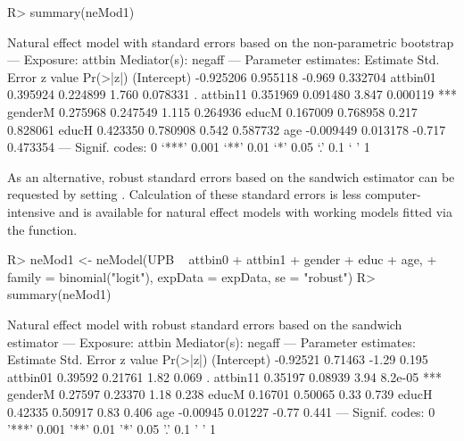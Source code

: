 \documentclass[nojss]{jss}
\begin{document}
\begin{Schunk}
\begin{Sinput}
R> summary(neMod1)
\end{Sinput}
\begin{Soutput}
Natural effect model
with standard errors based on the non-parametric bootstrap
---
Exposure: attbin 
Mediator(s): negaff 
---
Parameter estimates:
             Estimate Std. Error z value Pr(>|z|)    
(Intercept) -0.925206   0.955118  -0.969 0.332704    
attbin01     0.395924   0.224899   1.760 0.078331 .  
attbin11     0.351969   0.091480   3.847 0.000119 ***
genderM      0.275968   0.247549   1.115 0.264936    
educM        0.167009   0.768958   0.217 0.828061    
educH        0.423350   0.780908   0.542 0.587732    
age         -0.009449   0.013178  -0.717 0.473354     
---
Signif. codes:  0 ‘***’ 0.001 ‘**’ 0.01 ‘*’ 0.05 ‘.’ 0.1 ‘ ’ 1
\end{Soutput}
\end{Schunk}
\par As an alternative, robust standard errors based on the sandwich estimator \citep{Liang1986} can be requested by setting . Calculation of these standard errors is less computer-intensive and is available for natural effect models with working models fitted via the  function.
\begin{Schunk}
\begin{Sinput}
R> neMod1 <- neModel(UPB ~ attbin0 + attbin1 + gender + educ + age,
+    family = binomial("logit"), expData = expData, se = "robust")
R> summary(neMod1)
\end{Sinput}
\begin{Soutput}
Natural effect model
with robust standard errors based on the sandwich estimator
---
Exposure: attbin 
Mediator(s): negaff 
---
Parameter estimates:
            Estimate Std. Error z value Pr(>|z|)    
(Intercept) -0.92521    0.71463   -1.29    0.195    
attbin01     0.39592    0.21761    1.82    0.069 .  
attbin11     0.35197    0.08939    3.94  8.2e-05 ***
genderM      0.27597    0.23370    1.18    0.238    
educM        0.16701    0.50065    0.33    0.739    
educH        0.42335    0.50917    0.83    0.406    
age         -0.00945    0.01227   -0.77    0.441    
---
Signif. codes:  0 '***' 0.001 '**' 0.01 '*' 0.05 '.' 0.1 ' ' 1
\end{Soutput}
\end{Schunk}
\end{document}
